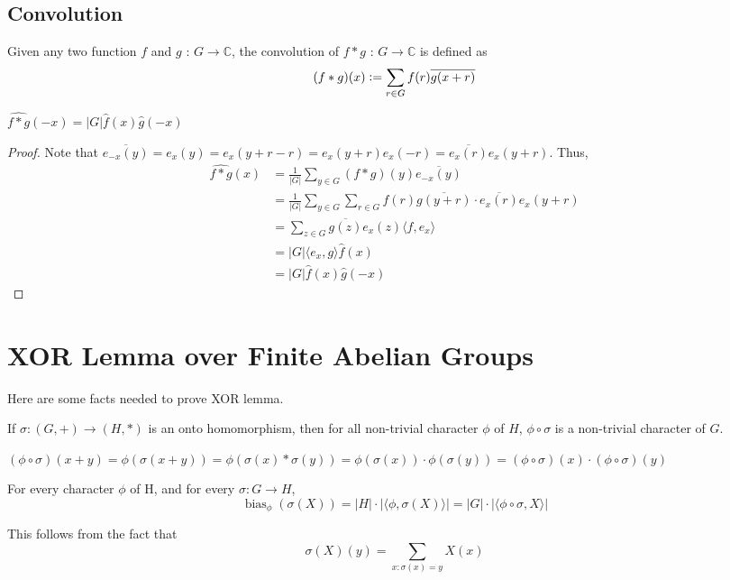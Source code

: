 \section{Convolution}
\begin{definition}
Given any two function $f$ and $g$ : $G \rightarrow \mathbb{C}$, the convolution of $f*g$ :  $G \rightarrow \mathbb{C}$ is defined as
$$(f*g)(x) \vcentcolon= \sum\limits_{r \in G} f(r) \overline{g(x +r)}$$
\end{definition}

\begin{prop}
$\widehat{f*g}(-x) = |G| \widehat{f}(x) \widehat{g}(-x)$
\end{prop}

\begin{proof}
Note that $\overline{e_{-x}(y)} = e_x(y) = e_x(y+r - r) = e_x(y+r) e_x(-r) = \overline {e_x(r)} e_x(y+r)$. Thus,
\begin{align*}
\widehat{f*g}(x)
& = \frac{1}{|G|} \sum\limits_{y \in G} (f*g)(y) \overline{e_{-x}(y)} \\
& = \frac{1}{|G|} \sum\limits_{y \in G}	
	\sum\limits_{r \in G} f(r) \overline{g(y +r)} \cdot  \overline{e_x(r)} e_x(y+r)\\
& = \sum\limits_{z \in G}	
	\overline{g(z)} e_x(z) \langle	f, e_x \rangle\\
& =|G| \langle e_x, g \rangle \widehat{f}(x) \\
& = |G| \widehat{f}(x) \widehat{g}(-x)		 	
\end{align*}
\end{proof}

\chapter{XOR Lemma over Finite Abelian Groups}

Here are some facts needed to prove XOR lemma. 
\begin{fact}
If $\sigma : (G, +) \rightarrow (H, *)$ is an onto homomorphism, then for all non-trivial character $\phi$ of $H$, $\phi \circ \sigma$ is a non-trivial character of $G$.
\end{fact} 
$(\phi \circ \sigma)(x+y) = \phi (\sigma (x+y)) = \phi (\sigma(x) * \sigma(y))
= \phi (\sigma (x)) \cdot \phi (\sigma (y)) 
= (\phi \circ \sigma)(x) \cdot (\phi \circ \sigma)(y)$

\begin{fact}
For every character $\phi$ of H, and for every $\sigma: G \rightarrow H$,
$$\operatorname{bias}_\phi(\sigma (X))
= |H| \cdot |\langle \phi, \sigma(X) \rangle | 
= |G| \cdot |\langle \phi \circ \sigma, X \rangle |$$
\end{fact}
This follows from the fact that
$$\sigma(X)(y) = \sum\limits_{x : \sigma(x) = y} X(x)$$

